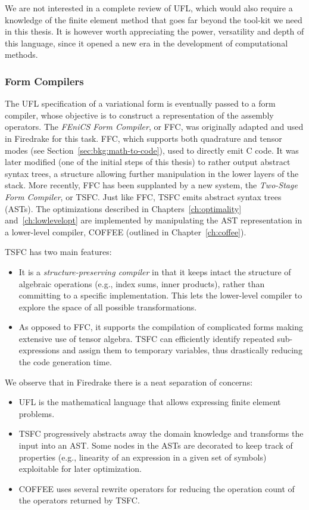 We are not interested in a complete review of UFL, which would also require a knowledge of the finite element method that goes far beyond the tool-kit we need in this thesis. It is however worth appreciating the power, versatility and depth of this language, since it opened a new era in the development of computational methods.


\subsubsection{Form Compilers}
The UFL specification of a variational form is eventually passed to a form compiler, whose objective is to construct a representation of the assembly operators. The {\em FEniCS Form Compiler}, or FFC, was originally adapted and used in Firedrake for this task. FFC, which supports both quadrature and tensor modes (see Section~\ref{sec:bkg:math-to-code}), used to directly emit C code. It was later modified (one of the initial steps of this thesis) to rather output abstract syntax trees, a structure allowing further manipulation in the lower layers of the stack. More recently, FFC has been supplanted by a new system, the {\em Two-Stage Form Compiler}, or TSFC. Just like FFC, TSFC emits abstract syntax trees (ASTs). The optimizations described in Chapters~\ref{ch:optimality} and~\ref{ch:lowlevelopt} are implemented by manipulating the AST representation in a lower-level compiler, COFFEE (outlined in Chapter~\ref{ch:coffee}). 

TSFC has two main features:
\begin{itemize}
\item It is a \textit{structure-preserving compiler} in that it keeps intact the structure of algebraic operations (e.g., index sums, inner products), rather than committing to a specific implementation. This lets the lower-level compiler to explore the space of all possible transformations.
\item As opposed to FFC, it supports the compilation of complicated forms making extensive use of tensor algebra. TSFC can efficiently identify repeated sub-expressions and assign them to temporary variables, thus drastically reducing the code generation time.
\end{itemize}

We observe that in Firedrake there is a neat separation of concerns:
\begin{itemize}
\item UFL is the mathematical language that allows expressing finite element problems.
\item TSFC progressively abstracts away the domain knowledge and transforms the input into an AST. Some nodes in the ASTs are decorated to keep track of properties (e.g., linearity of an expression in a given set of symbols) exploitable for later optimization.
\item COFFEE uses several rewrite operators for reducing the operation count of the operators returned by TSFC. 
\end{itemize}

